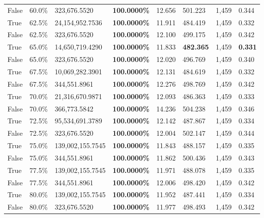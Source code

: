 \begin{table}[H]
\begin{tabular}{lllrllll}
\cline{1-8}
False & 60.0\% & 323,676.5520 & \bfseries \color{red} 100.0000\% & 12.656 & 501.223 & 1,459 & 0.344 \\
\cline{1-8}
True & 62.5\% & 24,154,952.7536 & \bfseries \color{red} 100.0000\% & 11.911 & 484.419 & 1,459 & 0.332 \\
\cline{1-8}
False & 62.5\% & 323,676.5520 & \bfseries \color{red} 100.0000\% & 12.100 & 499.175 & 1,459 & 0.342 \\
\cline{1-8}
True & 65.0\% & 14,650,719.4290 & \bfseries \color{red} 100.0000\% & 11.833 & \bfseries \color{red} 482.365 & 1,459 & \bfseries \color{red} 0.331 \\
\cline{1-8}
False & 65.0\% & 323,676.5520 & \bfseries \color{red} 100.0000\% & 12.020 & 496.769 & 1,459 & 0.340 \\
\cline{1-8}
True & 67.5\% & 10,069,282.3901 & \bfseries \color{red} 100.0000\% & 12.131 & 484.619 & 1,459 & 0.332 \\
\cline{1-8}
False & 67.5\% & 344,551.8961 & \bfseries \color{red} 100.0000\% & 12.276 & 498.769 & 1,459 & 0.342 \\
\cline{1-8}
True & 70.0\% & 21,316,670.9871 & \bfseries \color{red} 100.0000\% & 12.093 & 486.363 & 1,459 & 0.333 \\
\cline{1-8}
False & 70.0\% & 366,773.5842 & \bfseries \color{red} 100.0000\% & 14.236 & 504.238 & 1,459 & 0.346 \\
\cline{1-8}
True & 72.5\% & 95,534,691.3789 & \bfseries \color{red} 100.0000\% & 12.142 & 487.867 & 1,459 & 0.334 \\
\cline{1-8}
False & 72.5\% & 323,676.5520 & \bfseries \color{red} 100.0000\% & 12.004 & 502.147 & 1,459 & 0.344 \\
\cline{1-8}
True & 75.0\% & 139,002,155.7545 & \bfseries \color{red} 100.0000\% & 11.843 & 488.157 & 1,459 & 0.335 \\
\cline{1-8}
False & 75.0\% & 344,551.8961 & \bfseries \color{red} 100.0000\% & 11.862 & 500.436 & 1,459 & 0.343 \\
\cline{1-8}
True & 77.5\% & 139,002,155.7545 & \bfseries \color{red} 100.0000\% & 11.971 & 488.078 & 1,459 & 0.335 \\
\cline{1-8}
False & 77.5\% & 344,551.8961 & \bfseries \color{red} 100.0000\% & 12.006 & 498.420 & 1,459 & 0.342 \\
\cline{1-8}
True & 80.0\% & 139,002,155.7545 & \bfseries \color{red} 100.0000\% & 11.952 & 487.441 & 1,459 & 0.334 \\
\cline{1-8}
False & 80.0\% & 323,676.5520 & \bfseries \color{red} 100.0000\% & 11.977 & 498.493 & 1,459 & 0.342 \\

\end{tabular}
\end{table}
